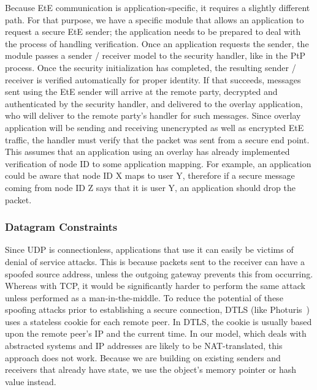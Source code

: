 \documentclass[conference]{IEEEtran}
\begin{document}
Because EtE communication is application-specific, it requires
a slightly different path.  For that purpose, we have a specific module that
allows an application to request a secure EtE sender; the application needs to be prepared to deal with the
process of handling verification.  Once an application requests the sender, the
module passes a sender / receiver model to the security handler, like in the PtP
process.  Once the security initialization has completed, the
resulting sender / receiver is verified automatically for proper identity.
If that succeeds, messages sent using the EtE sender will arrive at the remote
party, decrypted and authenticated by the security handler, and delivered to the
overlay application, who will deliver to the remote party's handler for such messages.
Since overlay application will be sending and receiving
unencrypted as well as encrypted EtE traffic, the handler must verify that the
packet was sent from a secure end point.  This assumes that an application using
an overlay has already implemented verification of node ID to some application
mapping.  For example, an application could be aware that node ID X maps to user
Y, therefore if a secure message coming from node ID Z says that it is user Y,
an application should drop the packet.

\subsubsection{Datagram Constraints}
Since UDP is connectionless, applications that use it can easily be victims of
denial of service attacks.  This is because packets sent to the receiver can
have a spoofed source address, unless the outgoing gateway prevents this from
occurring.  Whereas with TCP, it would be significantly harder to perform the
same attack unless performed as a man-in-the-middle.  To reduce the potential
of these spoofing attacks prior to establishing a secure connection, DTLS (like
Photuris~\cite{photuris}) uses a stateless cookie for each remote peer.  In
DTLS, the cookie is usually based upon the remote peer's IP and the current
time.  In our model, which deals with abstracted systems and IP addresses are likely to be NAT-translated, this approach does
not work.  Because we are building on existing senders and receivers
that already have state, we use the object's memory pointer or hash value
instead.
\end{document}

